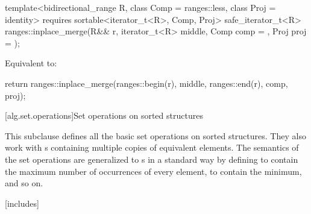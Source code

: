 \begin{itemdecl}
template<bidirectional_range R, class Comp = ranges::less, class Proj = identity>
  requires sortable<iterator_t<R>, Comp, Proj>
  safe_iterator_t<R>
    ranges::inplace_merge(R&& r, iterator_t<R> middle, Comp comp = {}, Proj proj = {});
\end{itemdecl}

\begin{itemdescr}
\pnum
\effects
Equivalent to:
\begin{codeblock}
return ranges::inplace_merge(ranges::begin(r), middle, ranges::end(r), comp, proj);
\end{codeblock}
\end{itemdescr}

[alg.set.operations]{Set operations on sorted structures}

\pnum
This subclause defines all the basic set operations on sorted structures.
They also work with s
containing multiple copies of equivalent elements.
The semantics of the set operations are generalized to s
in a standard way by defining 
to contain the maximum number of occurrences of every element,
 to contain the minimum, and so on.

[includes]{}

